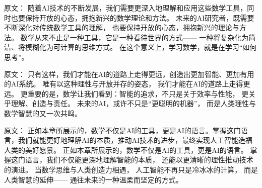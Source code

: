 原文：
随着AI技术的不断发展，我们需要更深入地理解和应用这些数学工具，同时也要保持开放的心态，拥抱新兴的数学理论和方法。
未来的AI研究者，既需要不断深化对传统数学工具的理解，  
也要保持开放的心态，拥抱新兴的理论与方法。  
数学从来不止是一种工具，它是一种看待世界的方式——  
一种将复杂化为简洁、将模糊化为可计算的思维方式。  
在这个意义上，学习数学，就是在学习“如何思考”。



原文：
只有这样，我们才能在AI的道路上走得更远，创造出更加智能、更加有用的AI系统。
唯有以这种理性与开放并存的姿态，  
我们才能在AI的道路上走得更远。  
更重要的是，数学让我们看到：智能的追求，不只是关于效率与性能，  
更关乎理解、创造与责任。  
未来的AI，或许不只是“更聪明的机器”，  
而是人类理性与数学智慧的又一次共鸣。


原文：
正如本章所展示的，数学不仅是AI的工具，更是AI的语言。掌握这门语言，我们就能更好地理解AI的本质，推动AI技术的进步，最终实现人工智能造福人类的美好愿景。
正如本章所展示的，数学不仅是AI的工具，更是AI的语言。  
掌握这门语言，我们不仅能更深地理解智能的本质，  
还能以更清晰的理性推动技术的演进。  
当数学思维与人类创造力相遇，  
人工智能不再只是冷冰冰的计算，  
而是人类智慧的延伸——  
通往未来的一种温柔而坚定的方式。



\nocite{*}

